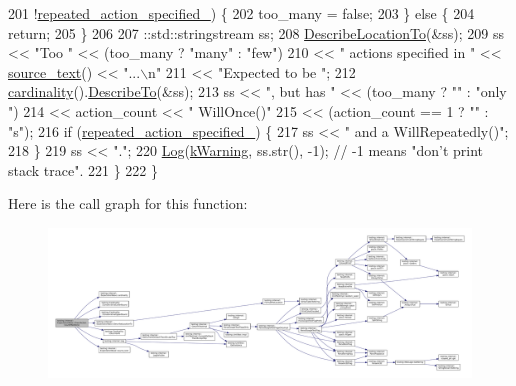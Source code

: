 \begin{DoxyCode}
201                !\hyperlink{classtesting_1_1internal_1_1ExpectationBase_abecd382b79252ffc0779d51e058b681c}{repeated\_action\_specified\_}) \{
202       too\_many = \textcolor{keyword}{false};
203     \} \textcolor{keywordflow}{else} \{
204       \textcolor{keywordflow}{return};
205     \}
206 
207     ::std::stringstream ss;
208     \hyperlink{classtesting_1_1internal_1_1ExpectationBase_a666e7f8fb2412e78f090244e6bfd4493}{DescribeLocationTo}(&ss);
209     ss << \textcolor{stringliteral}{"Too "} << (too\_many ? \textcolor{stringliteral}{"many"} : \textcolor{stringliteral}{"few"})
210        << \textcolor{stringliteral}{" actions specified in "} << \hyperlink{classtesting_1_1internal_1_1ExpectationBase_a77efdf254df61cfc4f28c91b0e6f62aa}{source\_text}() << \textcolor{stringliteral}{"...\(\backslash\)n"}
211        << \textcolor{stringliteral}{"Expected to be "};
212     \hyperlink{classtesting_1_1internal_1_1ExpectationBase_a1399efffbc8675510a15c6ba1f18184b}{cardinality}().\hyperlink{classtesting_1_1Cardinality_a2955f4b65022c422f56e79b767c4fa71}{DescribeTo}(&ss);
213     ss << \textcolor{stringliteral}{", but has "} << (too\_many ? \textcolor{stringliteral}{""} : \textcolor{stringliteral}{"only "})
214        << action\_count << \textcolor{stringliteral}{" WillOnce()"}
215        << (action\_count == 1 ? \textcolor{stringliteral}{""} : \textcolor{stringliteral}{"s"});
216     \textcolor{keywordflow}{if} (\hyperlink{classtesting_1_1internal_1_1ExpectationBase_abecd382b79252ffc0779d51e058b681c}{repeated\_action\_specified\_}) \{
217       ss << \textcolor{stringliteral}{" and a WillRepeatedly()"};
218     \}
219     ss << \textcolor{stringliteral}{"."};
220     \hyperlink{namespacetesting_1_1internal_ac0bc151763a8187d74387c4b2ba685c9}{Log}(\hyperlink{namespacetesting_1_1internal_a203d1a8a2147a53d12bbdae40d443914a5beeeab1b0a3caabd0afb43356c1a271}{kWarning}, ss.str(), -1);  \textcolor{comment}{// -1 means "don't print stack trace".}
221   \}
222 \}
\end{DoxyCode}
Here is the call graph for this function\+:
\nopagebreak
\begin{figure}[H]
\begin{center}
\leavevmode
\includegraphics[width=350pt]{classtesting_1_1internal_1_1ExpectationBase_aaeb143b6f8676e9a6fb9b17678344f03_cgraph}
\end{center}
\end{figure}
\mbox{\label{classtesting_1_1internal_1_1ExpectationBase_a2beebed3ade29077bcf294b449bb8b9d}} 
